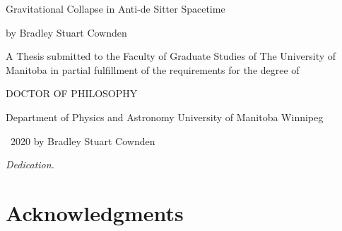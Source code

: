 \documentclass[12pt, a4paper]{report} %
\numberwithin{equation}{chapter}
\begin{document}
\setcounter{secnumdepth}{4}


\begin{titlepage}
\begin{center}
\vspace*{1.5cm}

{\Large Gravitational Collapse in Anti-de Sitter Spacetime}

\vspace{1.5cm}
 
by \linebreak
Bradley Stuart Cownden
\vspace{1.5cm}

A Thesis submitted to the Faculty of Graduate Studies of \linebreak
The University of Manitoba \linebreak 
in partial fulfillment of the requirements for the degree of

\vspace{1.5cm}

DOCTOR OF PHILOSOPHY

\vspace{1.5cm}

Department of Physics and Astronomy \linebreak
University of Manitoba \linebreak
Winnipeg

\vspace{1.5cm}

\textcopyright \, 2020 by Bradley Stuart Cownden
\end{center}
\end{titlepage}



\newpage
\vspace*{\fill}
\begin{center}
{\it Dedication.}
\end{center}
\vspace*{\fill}
\clearpage

\newpage


\vspace*{\fill}
\section*{Acknowledgments}
\end{document}
